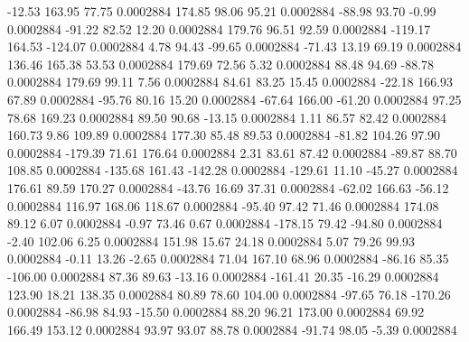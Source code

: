       -12.53      163.95       77.75     0.0002884
      174.85       98.06       95.21     0.0002884
      -88.98       93.70       -0.99     0.0002884
      -91.22       82.52       12.20     0.0002884
      179.76       96.51       92.59     0.0002884
     -119.17      164.53     -124.07     0.0002884
        4.78       94.43      -99.65     0.0002884
      -71.43       13.19       69.19     0.0002884
      136.46      165.38       53.53     0.0002884
      179.69       72.56        5.32     0.0002884
       88.48       94.69      -88.78     0.0002884
      179.69       99.11        7.56     0.0002884
       84.61       83.25       15.45     0.0002884
      -22.18      166.93       67.89     0.0002884
      -95.76       80.16       15.20     0.0002884
      -67.64      166.00      -61.20     0.0002884
       97.25       78.68      169.23     0.0002884
       89.50       90.68      -13.15     0.0002884
        1.11       86.57       82.42     0.0002884
      160.73        9.86      109.89     0.0002884
      177.30       85.48       89.53     0.0002884
      -81.82      104.26       97.90     0.0002884
     -179.39       71.61      176.64     0.0002884
        2.31       83.61       87.42     0.0002884
      -89.87       88.70      108.85     0.0002884
     -135.68      161.43     -142.28     0.0002884
     -129.61       11.10      -45.27     0.0002884
      176.61       89.59      170.27     0.0002884
      -43.76       16.69       37.31     0.0002884
      -62.02      166.63      -56.12     0.0002884
      116.97      168.06      118.67     0.0002884
      -95.40       97.42       71.46     0.0002884
      174.08       89.12        6.07     0.0002884
       -0.97       73.46        0.67     0.0002884
     -178.15       79.42      -94.80     0.0002884
       -2.40      102.06        6.25     0.0002884
      151.98       15.67       24.18     0.0002884
        5.07       79.26       99.93     0.0002884
       -0.11       13.26       -2.65     0.0002884
       71.04      167.10       68.96     0.0002884
      -86.16       85.35     -106.00     0.0002884
       87.36       89.63      -13.16     0.0002884
     -161.41       20.35      -16.29     0.0002884
      123.90       18.21      138.35     0.0002884
       80.89       78.60      104.00     0.0002884
      -97.65       76.18     -170.26     0.0002884
      -86.98       84.93      -15.50     0.0002884
       88.20       96.21      173.00     0.0002884
       69.92      166.49      153.12     0.0002884
       93.97       93.07       88.78     0.0002884
      -91.74       98.05       -5.39     0.0002884
